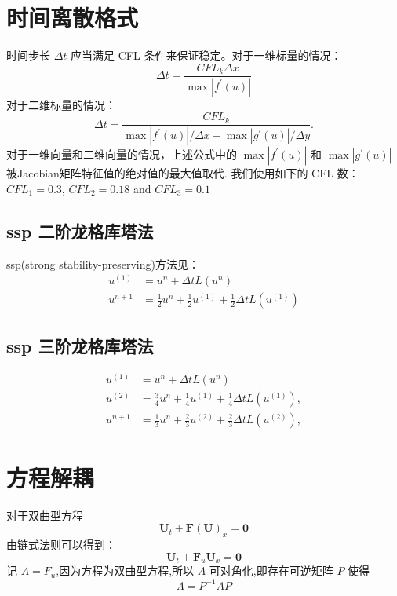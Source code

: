 \documentclass{book}
\begin{document}
\section{时间离散格式}
时间步长 $\Delta t$  应当满足 CFL 条件来保证稳定。对于一维标量的情况：
\begin{equation}
  \Delta t=\frac{C F L_{k} \Delta x}{\max \left|f^{\prime}(u)\right|}
\end{equation}
对于二维标量的情况：
\begin{equation}
  \Delta t=\frac{C F L_{k}}{\max \left|f^{\prime}(u)\right| / \Delta x+\max \left|g^{\prime}(u)\right| / \Delta y} .
\end{equation}
对于一维向量和二维向量的情况，上述公式中的 $\max \left|f^{\prime}(u)\right|$ 和 $\max \left|g^{\prime}(u)\right|$  被Jacobian矩阵特征值的绝对值的最大值取代. 我们使用如下的 CFL 数\cite{RN109}\cite{RN133}\cite{RN148}：  $CFL_1=0.3$, $C F L_{2}=0.18$  and  $C F L_{3}=0.1$

\subsection{ssp 二阶龙格库塔法}
ssp(strong stability-preserving)方法见：\cite{RN96}
\begin{equation}
  \begin{aligned}
    u^{(1)} & =u^{n}+\Delta t L\left(u^{n}\right)                                               \\
    u^{n+1} & =\frac{1}{2} u^{n}+\frac{1}{2} u^{(1)}+\frac{1}{2} \Delta t L\left(u^{(1)}\right)
  \end{aligned}
\end{equation}
\subsection{ssp 三阶龙格库塔法}
\begin{equation}
  \begin{aligned}
    u^{(1)} & =u^{n}+\Delta t L\left(u^{n}\right)                                                \\
    u^{(2)} & =\frac{3}{4} u^{n}+\frac{1}{4} u^{(1)}+\frac{1}{4} \Delta t L\left(u^{(1)}\right), \\
    u^{n+1} & =\frac{1}{3} u^{n}+\frac{2}{3} u^{(2)}+\frac{2}{3} \Delta t L\left(u^{(2)}\right),
  \end{aligned}
\end{equation}

\section{方程解耦}
对于双曲型方程
\begin{equation}
  \mathbf{U}_{t}+\mathbf{F}(\mathbf{U})_{x}=\mathbf{0}
\end{equation}
由链式法则可以得到：
\begin{equation}
  \mathbf{U}_{t}+\mathbf{F}_u\mathbf{U}_{x}=\mathbf{0}
\end{equation}
记 $A=F_u$,因为方程为双曲型方程,所以 $A$ 可对角化,即存在可逆矩阵 $P$ 使得
\begin{equation}
  \Lambda = P^{-1}AP
\end{equation}
\end{document}
